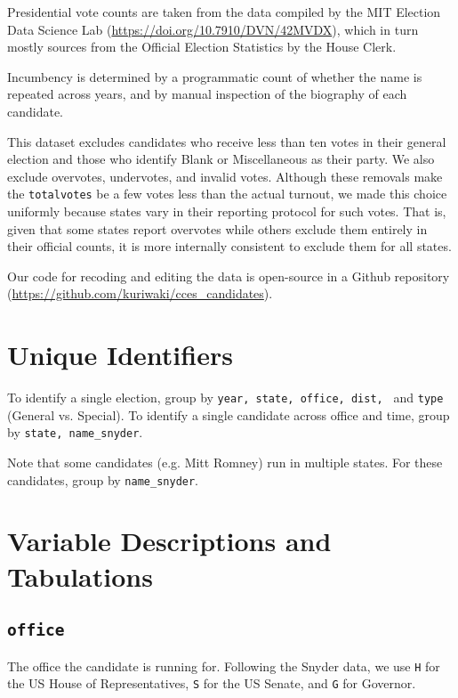 \documentclass[12pt]{article}
\begin{document}
Presidential vote counts are taken from the data compiled by the MIT Election Data Science Lab (\url{https://doi.org/10.7910/DVN/42MVDX}), which in turn mostly sources from the Official Election Statistics by the House Clerk. 

Incumbency is determined by a programmatic count of whether the name is repeated across years, and by manual inspection of the biography of each candidate.

This dataset excludes candidates who receive less than ten votes in their general election and those who identify Blank or Miscellaneous as their party.
We also exclude overvotes, undervotes, and invalid votes.
Although these removals make the \texttt{totalvotes} be a few votes less than the actual turnout, we made this choice uniformly because states vary in their reporting protocol for such votes. That is, given that some states report overvotes while others exclude them entirely in their official counts, it is more internally consistent to exclude them for all states.

Our code for recoding and editing the data is open-source in a Github repository (\url{https://github.com/kuriwaki/cces_candidates}).


\section{Unique Identifiers}

To identify a single election, group by \texttt{year, state, office, dist, } and \texttt{type} (General vs. Special).  To identify a single candidate across office and time, group by \texttt{state, name\_snyder}. 

Note that some candidates (e.g. Mitt Romney) run in multiple states. For these candidates, group by \texttt{name\_snyder}. 
\section{Variable Descriptions and Tabulations}



\subsection*{\texttt{office}}

The office the candidate is running for. Following the Snyder data, we use \texttt{H} for the US House of Representatives, \texttt{S} for the US Senate, and \texttt{G} for Governor. 
\end{document}
